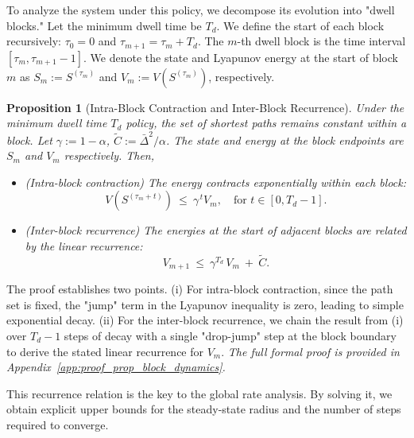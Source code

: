\documentclass[journal]{IEEEtran}
\newtheorem{proposition}{Proposition}
\begin{document}
To analyze the system under this policy, we decompose its evolution into "dwell blocks." Let the minimum dwell time be $T_d$. We define the start of each block recursively: $\tau_0=0$ and $\tau_{m+1} = \tau_m + T_d$. The $m$-th dwell block is the time interval $[\tau_m, \tau_{m+1}-1]$. We denote the state and Lyapunov energy at the start of block $m$ as $S_m := S^{(\tau_m)}$ and $V_m := V(S^{(\tau_m)})$, respectively.

\begin{proposition}[Intra-Block Contraction and Inter-Block Recurrence]
\label{prop:block_dynamics}
Under the minimum dwell time $T_d$ policy, the set of shortest paths remains constant within a block. Let $\gamma:=1-\alpha$, $\tilde C:=\bar\Delta^2/\alpha$. The state and energy at the block endpoints are $S_m$ and $V_m$ respectively. Then,
\begin{itemize}
    \item[\textit{(i)}] (Intra-block contraction) The energy contracts exponentially within each block:
    \begin{equation}\label{eq:intra_block}
    V(S^{(\tau_m+t)})\ \le\ \gamma^{\,t}V_m, \quad \text{for } t \in [0, T_d-1].
    \end{equation}
    \item[\textit{(ii)}] (Inter-block recurrence) The energies at the start of adjacent blocks are related by the linear recurrence:
    \begin{equation}\label{eq:inter_block}
    V_{m+1}\ \le\ \gamma^{T_d}\,V_m\ +\ \tilde C.
    \end{equation}
\end{itemize}
\end{proposition}
\begin{IEEEproof}
The proof establishes two points. (i) For intra-block contraction, since the path set is fixed, the "jump" term in the Lyapunov inequality is zero, leading to simple exponential decay. (ii) For the inter-block recurrence, we chain the result from (i) over $T_d-1$ steps of decay with a single "drop-jump" step at the block boundary to derive the stated linear recurrence for $V_m$. \textit{The full formal proof is provided in Appendix~\ref{app:proof_prop_block_dynamics}.}
\end{IEEEproof}

This recurrence relation is the key to the global rate analysis. By solving it, we obtain explicit upper bounds for the steady-state radius and the number of steps required to converge.
\end{document}
